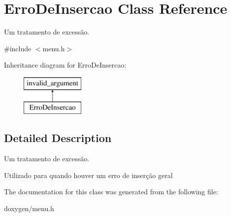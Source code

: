 \hypertarget{class_erro_de_insercao}{}\section{Erro\+De\+Insercao Class Reference}
\label{class_erro_de_insercao}


Um tratamento de excessão.  




{\ttfamily \#include $<$menu.\+h$>$}

Inheritance diagram for Erro\+De\+Insercao\+:\begin{figure}[H]
\begin{center}
\leavevmode
\includegraphics[height=2.000000cm]{class_erro_de_insercao}
\end{center}
\end{figure}


\subsection{Detailed Description}
Um tratamento de excessão. 

Utilizado para quando houver um erro de inserção geral 

The documentation for this class was generated from the following file\+:\begin{DoxyCompactItemize}
\item 
doxygen/menu.\+h\end{DoxyCompactItemize}
